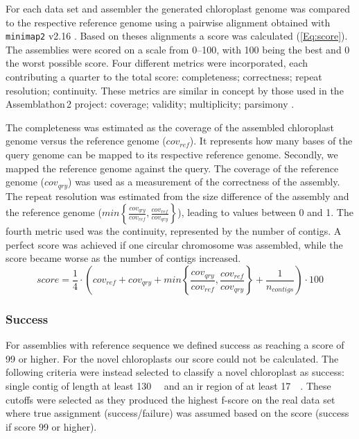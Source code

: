 \documentclass{bmcart}
\newcommand{\todo}[1]{\textcolor{red}{\bfseries(ToDO: #1})}
\begin{document}
%



For each data set and assembler the generated chloroplast genome was compared to the respective reference genome using a pairwise alignment obtained with \texttt{minimap2} v2.16 \cite{li2018minimap2}. Based on theses alignments a score was calculated (\cref{Eq:score}).
The assemblies were scored on a scale from \numrange{0}{100}, with \num{100} being the best and \num{0} the worst possible score.
Four different metrics were incorporated, each contributing a quarter to the total score: completeness; correctness; repeat resolution; continuity.
These metrics are similar in concept by those used in the Assemblathon\,2 project: coverage; validity; multiplicity; parsimony \cite{assemblathon2}.

The completeness was estimated as the coverage of the assembled chloroplast genome versus the reference genome ($cov_{ref}$).
It represents how many bases of the query genome can be mapped to its respective reference genome.
Secondly, we mapped the reference genome against the query.
The coverage of the reference genome ($cov_{qry}$) was used as a measurement of the correctness of the assembly.
The repeat resolution was estimated from the size difference of the assembly and the reference genome ($min\left\{ \frac{cov_{qry}}{cov_{ref}}, \frac{cov_{ref}}{cov_{qry}}\right\}$), leading to values between \num{0} and \num{1}.
The fourth metric used was the continuity, represented by the number of contigs.
A perfect score was achieved if one circular chromosome was assembled, while the score became worse as the number of contigs increased.
\begin{equation}
   score = \frac{1}{4} \cdot \left( cov_{ref} +  cov_{qry} + min\left\{ \frac{cov_{qry}}{cov_{ref}}, \frac{cov_{ref}}{cov_{qry}}\right\} + \frac{1}{n_{contigs} }\right) \cdot 100 
   \label{Eq:score}
\end{equation}

\subsubsection*{Success}
For assemblies with reference sequence we defined success as reaching a score of 99 or higher.
For the novel chloroplasts our score could not be calculated.
The following criteria were instead selected to classify a novel chloroplast as success: single contig of length at least \SI{130}{\kilo\basepair{}} and an \gls{ir} region of at least \SI{17}{\kilo\basepair{}}.
These cutoffs were selected as they produced the highest f-score on the real data set where true assignment (success/failure) was assumed based on the score (success if score \num{99} or higher).
\end{document}
